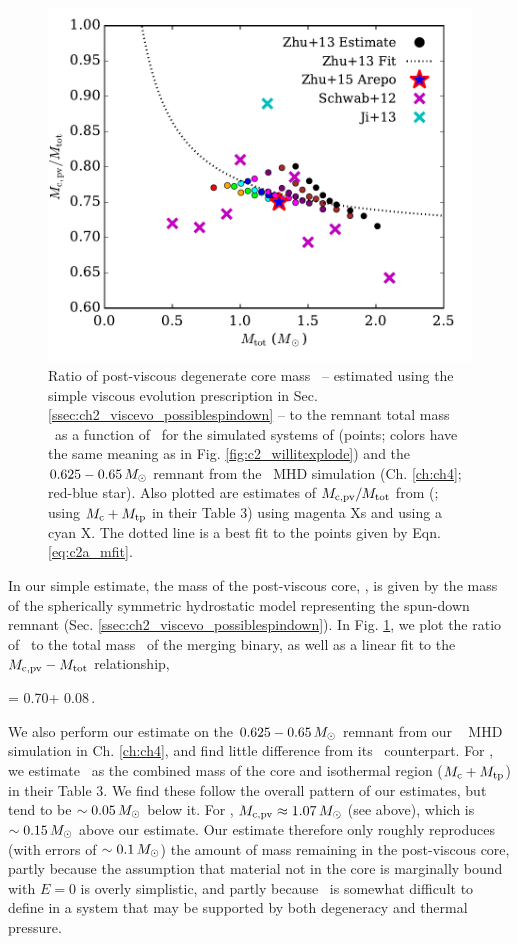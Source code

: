 
\begin{figure}
\centering
\includegraphics[angle=0,width=0.6\columnwidth]{chapter2_zhu+13/figures/c2a_mcpv.pdf}
\caption{Ratio of post-viscous degenerate core mass \Mcpv\ -- estimated using the simple viscous evolution prescription in Sec. \ref{ssec:ch2_viscevo_possiblespindown} -- to the remnant total mass \Mtot\ as a function of \Mtot\ for the simulated systems of \citeal{zhu+13} (points; colors have the same meaning as in Fig. \ref{fig:c2_willitexplode}) and the $0.625 - 0.65\,\Msun$ remnant from the \arepo\ MHD simulation (Ch. \ref{ch:ch4}; red-blue star).  Also plotted are estimates of $\Mcpv/\Mtot$ from \citeauthor{schw+12} (\citeyear{schw+12}; using $M_\mathrm{c} + M_\mathrm{tp}$ in their Table 3) using magenta Xs and \cite{ji+13} using a cyan X.  The dotted line is a best fit to the \citeal{zhu+13} points given by Eqn. \ref{eq:c2a_mfit}.}
\label{fig:c2a_mcpvvsmtot}
\end{figure}

In our simple estimate, the mass of the post-viscous core, \Mcpv, is given by the mass of the spherically symmetric hydrostatic model representing the spun-down remnant (Sec. \ref{ssec:ch2_viscevo_possiblespindown}).  In Fig. \ref{fig:c2a_mcpvvsmtot}, we plot the ratio of \Mcpv\ to the total mass \Mtot\ of the merging binary, as well as a linear fit to the $\Mcpv-\Mtot$ relationship,

\eqbegin
\Mcpv = 0.70\Mtot + 0.08\,\Msun.
\label{eq:c2a_mfit}
\eqend

\noindent  We also perform our estimate on the $0.625 - 0.65\,\Msun$ remnant from our \arepo\ \citep{spri10} MHD simulation in Ch. \ref{ch:ch4}, and find little difference from its \gasoline\ counterpart.  For \cite{schw+12}, we estimate \Mcpv\ as the combined mass of the core and isothermal region ($M_\mathrm{c} + M_\mathrm{tp}$) in their Table 3.  We find these follow the overall pattern of our estimates, but tend to be $\sim0.05\,\Msun$ below it.  For \cite{ji+13}, $\Mcpv \approx 1.07\,\Msun$ (see above), which is $\sim0.15\,\Msun$ above our estimate.  Our estimate therefore only roughly reproduces (with errors of $\sim0.1\,\Msun$) the amount of mass remaining in the post-viscous core, partly because the assumption that material not in the core is marginally bound with $E = 0$ is overly simplistic, and partly because \Mcpv\ is somewhat difficult to define in a system that may be supported by both degeneracy and thermal pressure.


